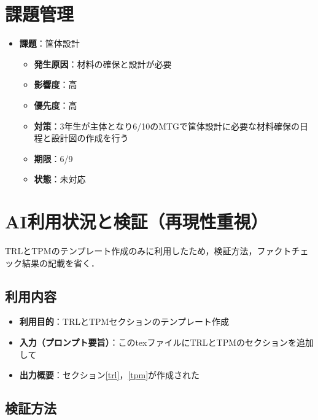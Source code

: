 \documentclass[a4paper,12pt]{ltjsarticle}
\begin{document}
\section{課題管理}
\begin{itemize}
  \item \textbf{課題}：筐体設計
    \begin{itemize}
      \item \textbf{発生原因}：材料の確保と設計が必要
      \item \textbf{影響度}：高
      \item \textbf{優先度}：高
      \item \textbf{対策}：3年生が主体となり6/10のMTGで筐体設計に必要な材料確保の日程と設計図の作成を行う
      \item \textbf{期限}：6/9
      \item \textbf{状態}：未対応
    \end{itemize}
\end{itemize}


\section{AI利用状況と検証（再現性重視）}
TRLとTPMのテンプレート作成のみに利用したため，検証方法，ファクトチェック結果の記載を省く．

\subsection{利用内容}
\begin{itemize}
  \item \textbf{利用目的}：TRLとTPMセクションのテンプレート作成
  \item \textbf{入力（プロンプト要旨）}：このtexファイルにTRLとTPMのセクションを追加して
  \item \textbf{出力概要}：セクション\ref{trl}，\ref{tpm}が作成された
\end{itemize}

\subsection{検証方法}
\end{document}
